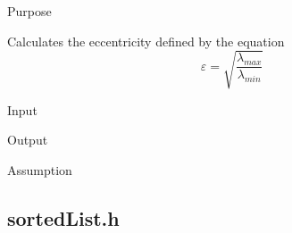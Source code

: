 \documentclass[pdftex, 11pt]{article}
\begin{document}
\begin{description}
\begin{description}
			\item{Purpose}

				Calculates the eccentricity defined by the equation
				\[
				\varepsilon = \sqrt{\frac{\lambda_{max}}{\lambda_{min}}}
				\]

			\item{Input}

			\item{Output}

			\item{Assumption}

		\end{description}

\end{description}

\subsection{sortedList.h}
\end{document}
